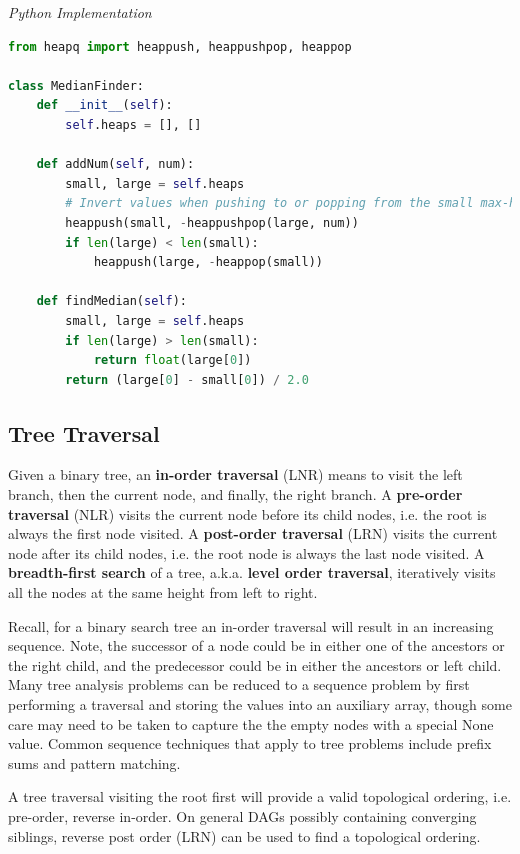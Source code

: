 \documentclass{article}
\begin{document}
\vspace{8pt} \emph{Python Implementation}
\begin{lstlisting}[language=Python]
from heapq import heappush, heappushpop, heappop

class MedianFinder:
    def __init__(self):
        self.heaps = [], []

    def addNum(self, num):
        small, large = self.heaps
        # Invert values when pushing to or popping from the small max-heap. heapq uses a min heap by default.
        heappush(small, -heappushpop(large, num))
        if len(large) < len(small):
            heappush(large, -heappop(small))

    def findMedian(self):
        small, large = self.heaps
        if len(large) > len(small):
            return float(large[0])
        return (large[0] - small[0]) / 2.0
\end{lstlisting}

    
    \subsection{Tree Traversal}
    Given a binary tree, an \textbf{in-order traversal} (LNR) means to visit the left branch, then the current node, and finally, the right branch. A \textbf{pre-order traversal} (NLR) visits the current node before its child nodes, i.e. the root is always the first node visited. A \textbf{post-order traversal} (LRN) visits the current node after its child nodes, i.e. the root node is always the last node visited. A \textbf{breadth-first search} of a tree, a.k.a. \textbf{level order traversal}, iteratively visits all the nodes at the same height from left to right.
    
    Recall, for a binary search tree an in-order traversal will result in an increasing sequence. Note, the successor of a node could be in either one of the ancestors or the right child, and the predecessor could be in either the ancestors or left child. Many tree analysis problems can be reduced to a sequence problem by first performing a traversal and storing the values into an auxiliary array, though some care may need to be taken to capture the the empty nodes with a special None value. Common sequence techniques that apply to tree problems include prefix sums and pattern matching.

    A tree traversal visiting the root first will provide a valid topological ordering, i.e. pre-order, reverse in-order. On general DAGs possibly containing converging siblings, reverse post order (LRN) can be used to find a topological ordering.
\end{document}
